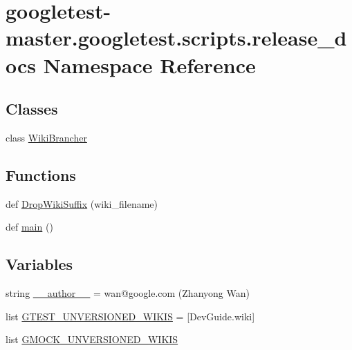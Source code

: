 \hypertarget{namespacegoogletest-master_1_1googletest_1_1scripts_1_1release__docs}{}\section{googletest-\/master.googletest.\+scripts.\+release\+\_\+docs Namespace Reference}
\label{namespacegoogletest-master_1_1googletest_1_1scripts_1_1release__docs}
\subsection*{Classes}
\begin{DoxyCompactItemize}
\item 
class \mbox{\hyperlink{classgoogletest-master_1_1googletest_1_1scripts_1_1release__docs_1_1_wiki_brancher}{Wiki\+Brancher}}
\end{DoxyCompactItemize}
\subsection*{Functions}
\begin{DoxyCompactItemize}
\item 
def \mbox{\hyperlink{namespacegoogletest-master_1_1googletest_1_1scripts_1_1release__docs_a908212f861885cf62b68332b09cf9f58}{Drop\+Wiki\+Suffix}} (wiki\+\_\+filename)
\item 
def \mbox{\hyperlink{namespacegoogletest-master_1_1googletest_1_1scripts_1_1release__docs_a6907eb183423ba23daba08bd4cf71d42}{main}} ()
\end{DoxyCompactItemize}
\subsection*{Variables}
\begin{DoxyCompactItemize}
\item 
string \mbox{\hyperlink{namespacegoogletest-master_1_1googletest_1_1scripts_1_1release__docs_a9e02120e61a5b4776366571e4cf6223a}{\+\_\+\+\_\+author\+\_\+\+\_\+}} = \textquotesingle{}wan@google.\+com (Zhanyong Wan)\textquotesingle{}
\item 
list \mbox{\hyperlink{namespacegoogletest-master_1_1googletest_1_1scripts_1_1release__docs_a0bfd729098eeeba574aee699b6c0536e}{G\+T\+E\+S\+T\+\_\+\+U\+N\+V\+E\+R\+S\+I\+O\+N\+E\+D\+\_\+\+W\+I\+K\+IS}} = \mbox{[}\textquotesingle{}Dev\+Guide.\+wiki\textquotesingle{}\mbox{]}
\item 
list \mbox{\hyperlink{namespacegoogletest-master_1_1googletest_1_1scripts_1_1release__docs_a05ee9e0e6a3c10d9d808597d60d324cf}{G\+M\+O\+C\+K\+\_\+\+U\+N\+V\+E\+R\+S\+I\+O\+N\+E\+D\+\_\+\+W\+I\+K\+IS}}
\end{DoxyCompactItemize}


